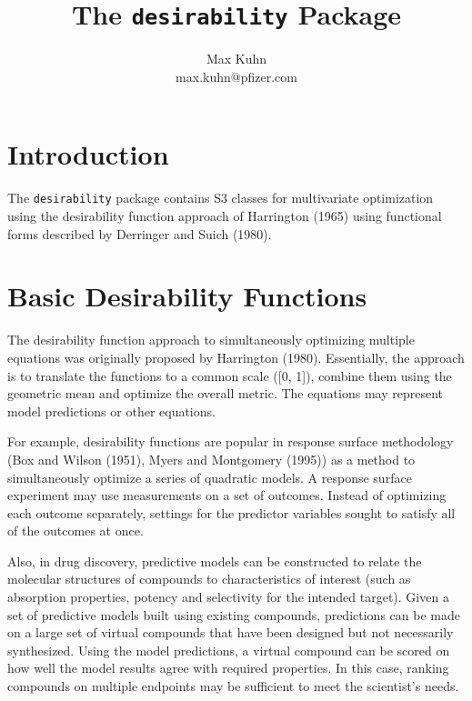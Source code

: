 \documentclass[12pt]{article}
\title{The \texttt{desirability} Package}
\author{Max Kuhn \\ max.kuhn@pfizer.com}
\begin{document}
\maketitle

\thispagestyle{empty}
      
\section{Introduction}

The \texttt{desirability} package contains S3 classes for multivariate optimization using the desirability function approach of Harrington (1965) using functional forms described by Derringer and Suich (1980).

\section{Basic Desirability Functions}

The desirability function approach to simultaneously optimizing multiple equations was originally proposed by Harrington (1980). Essentially, the approach is to translate the functions to a common scale ([0, 1]), combine them using the geometric mean and optimize the overall metric. The equations may represent model predictions or other equations. 

For example, desirability functions are popular in response surface methodology (Box and Wilson (1951), Myers and Montgomery (1995)) as a method to simultaneously optimize a series of quadratic models. A response surface experiment may use measurements on a set of outcomes. Instead of optimizing each outcome separately, settings for the predictor variables sought to satisfy all of the outcomes at once.

Also, in drug discovery, predictive models can be constructed to relate the molecular structures of compounds to characteristics of interest (such as absorption properties, potency and selectivity for the intended target). Given a set of predictive models built using existing compounds, predictions can be made on a large set of virtual compounds that have been designed but not necessarily synthesized. Using the model predictions, a virtual compound can be scored on how well the model results agree with required properties. In this case, ranking compounds on multiple endpoints may be sufficient to meet the scientist's needs.
\end{document}
